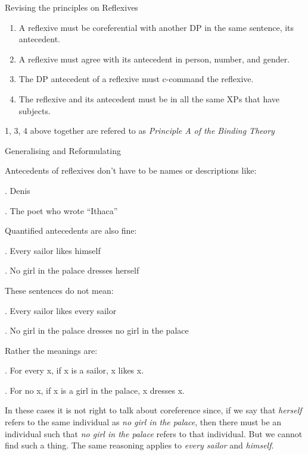 \begin{frame}
  {Revising the principles on Reflexives}

  \begin{enumerate}
  \item A reflexive must be coreferential with another DP in the same sentence, its antecedent.
  \item A reflexive must agree with its antecedent in person, number, and gender.
  \item The DP antecedent of a reflexive must c-command the reflexive.
  \item The reflexive and its antecedent must be in all the same XPs that have subjects.
  \end{enumerate}


1, 3, 4 above together are refered to as \textit{Principle A of the Binding Theory}

\end{frame}

\begin{frame}
  {Generalising and Reformulating}

Antecedents of reflexives don't have to be names or descriptions like:

\ex. Denis

\ex. The poet who wrote ``Ithaca''

\end{frame}

\begin{frame}

Quantified antecedents are also fine:

\ex.
Every sailor likes himself

\ex.
No girl in the palace dresses herself


These sentences do not mean:

\ex.
Every sailor likes every sailor

\ex.
No girl in the palace dresses no girl in the palace
 
\end{frame}


\begin{frame}

Rather the meanings are:

\ex.
For every x, if x is a sailor, x likes x.

\ex.
For no x, if x is a girl in the palace, x dresses x.

\end{frame}

\begin{frame}
  In these cases it is not right to talk about coreference since, if we say that  \textit{herself} refers to the same individual as \textit{no girl in the palace}, then there must be an individual such that \textit{no girl in the palace} refers to that individual.  But we cannot find such a thing.  The same reasoning applies to \textit{every sailor} and \textit{himself}.

\end{frame}


